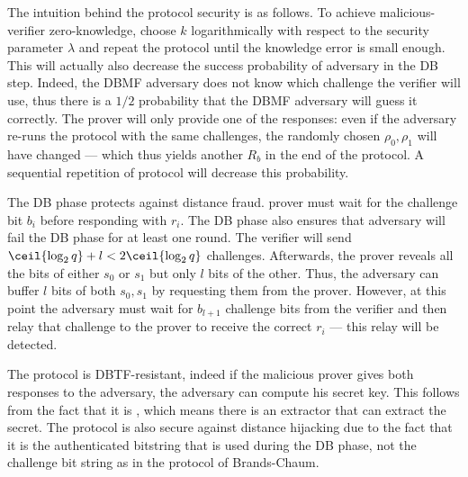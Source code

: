 The intuition behind the protocol security is as follows.
To achieve malicious-verifier zero-knowledge, choose \(k\) logarithmically with respect to the security parameter \(\lambda\) and repeat the protocol until the knowledge error is small enough.
This will actually also decrease the success probability of  adversary in the \ac{DB} step.
Indeed, the \ac{DBMF} adversary does not know which challenge the verifier will use, thus there is a \(1/2\) probability that the \ac{DBMF} adversary will guess it correctly.
The prover will only provide one of the responses: even if the adversary re-runs the protocol with the same challenges, the randomly chosen \(\rho_0, \rho_1\) will have changed --- which thus yields another \(R_b\) in the end of the protocol.
A sequential repetition of protocol will decrease this probability.

The \ac{DB} phase protects against distance fraud.
 prover must wait for the challenge bit \(b_i\) before responding with \(r_i\).
The \ac{DB} phase also ensures that  adversary will fail the \ac{DB} phase for at least one round.
The verifier will send \(\ceil{\log_2 q} + l < 2\ceil{\log_2 q}\) challenges.
Afterwards, the prover reveals all the bits of either \(s_0\) or \(s_1\) but only \(l\) bits of the other.
Thus, the adversary can buffer \(l\) bits of both \(s_0, s_1\) by requesting them from the prover.
However, at this point the adversary must wait for \(b_{l+1}\) challenge bits from the verifier and then relay that challenge to the prover to receive the correct \(r_i\) --- this relay will be detected.

The protocol is \ac{DBTF}-resistant, indeed if the malicious prover gives both responses to the adversary, the adversary can compute his secret key.
This follows from the fact that it is , which means there is an extractor that can extract the secret.
The protocol is also secure against distance hijacking due to the fact that it is the authenticated bitstring that is used during the \ac{DB} phase, not the challenge bit string as in the protocol of Brands-Chaum.
